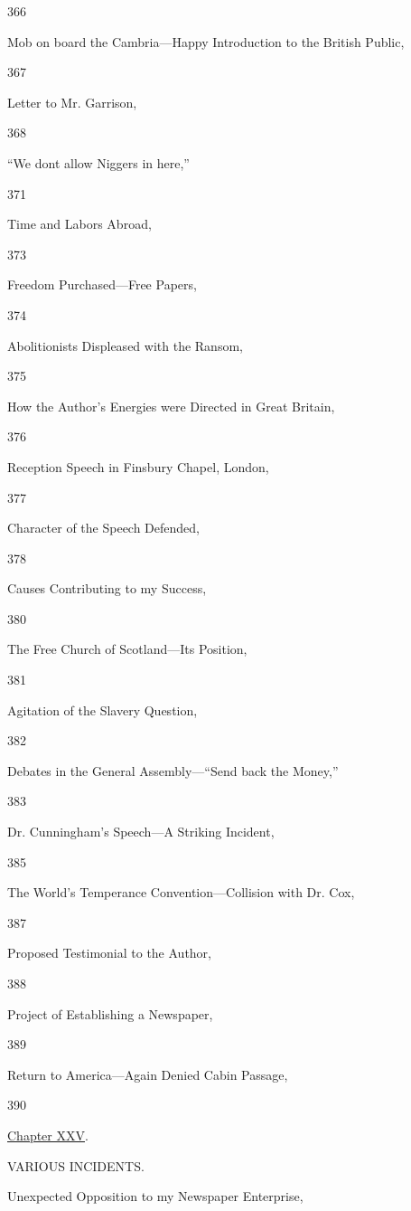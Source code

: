 366

Mob on board the Cambria---Happy Introduction to the British Public,

367

Letter to Mr. Garrison,

368

``We dont allow Niggers in here,''

371

Time and Labors Abroad,

373

Freedom Purchased---Free Papers,

374

Abolitionists Displeased with the Ransom,

375

How the Author's Energies were Directed in Great Britain,

376

Reception Speech in Finsbury Chapel, London,

377

Character of the Speech Defended,

378

Causes Contributing to my Success,

380

The Free Church of Scotland---Its Position,

381

Agitation of the Slavery Question,

382

Debates in the General Assembly---``Send back the Money,''

383

Dr. Cunningham's Speech---A Striking Incident,

385

The World's Temperance Convention---Collision with Dr. Cox,

387

Proposed Testimonial to the Author,

388

Project of Establishing a Newspaper,

389

Return to America---Again Denied Cabin Passage,

390

\href{/wiki/My_Bondage_and_My_Freedom_(1855)/Chapter_XXV}{Chapter XXV}.

VARIOUS INCIDENTS.

Unexpected Opposition to my Newspaper Enterprise,

